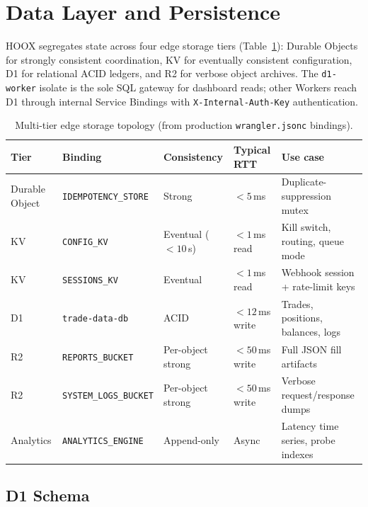 \section{Data Layer and Persistence}
\label{sec:data-layer}

\textsc{HOOX} segregates state across four edge storage tiers (Table~\ref{tab:storage-tiers}): Durable Objects for strongly consistent coordination, KV for eventually consistent configuration, D1 for relational ACID ledgers, and R2 for verbose object archives. The \texttt{d1-worker} isolate is the sole SQL gateway for dashboard reads; other Workers reach D1 through internal Service Bindings with \texttt{X-Internal-Auth-Key} authentication.

\begin{table}[t]
  \centering
  \caption{Multi-tier edge storage topology (from production \texttt{wrangler.jsonc} bindings).}
  \label{tab:storage-tiers}
  \small
  \begin{tabular*}{\linewidth}{@{\extracolsep{\fill}}llllp{4.5cm}@{}}
    \toprule
    \textbf{Tier} & \textbf{Binding} & \textbf{Consistency} & \textbf{Typical RTT} & \textbf{Use case} \\
    \midrule
    Durable Object & \texttt{IDEMPOTENCY\_STORE} & Strong & ${<}5$\,ms & Duplicate-suppression mutex \\
    KV & \texttt{CONFIG\_KV} & Eventual (${<}10$\,s) & ${<}1$\,ms read & Kill switch, routing, queue mode \\
    KV & \texttt{SESSIONS\_KV} & Eventual & ${<}1$\,ms read & Webhook session + rate-limit keys \\
    D1 & \texttt{trade-data-db} & ACID & ${<}12$\,ms write & Trades, positions, balances, logs \\
    R2 & \texttt{REPORTS\_BUCKET} & Per-object strong & ${<}50$\,ms write & Full JSON fill artifacts \\
    R2 & \texttt{SYSTEM\_LOGS\_BUCKET} & Per-object strong & ${<}50$\,ms write & Verbose request/response dumps \\
    Analytics & \texttt{ANALYTICS\_ENGINE} & Append-only & Async & Latency time series, probe indexes \\
    \bottomrule
  \end{tabular*}
\end{table}

\subsection{D1 Schema}

